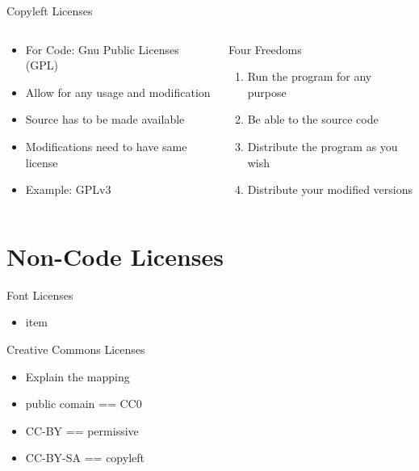 \documentclass[compress,aspectratio=169]{beamer}
\begin{document}
  \begin{frame}{Copyleft Licenses}
    \begin{columns}
      \begin{column}{0.5\textwidth}
        \begin{itemize}
          \item For Code: Gnu Public Licenses (GPL)
          \item Allow for any usage and modification
          \item Source has to be made available
          \item Modifications need to have same license
          \item Example: GPLv3
        \end{itemize}
      \end{column}
      \begin{column}{0.5\textwidth}
        \begin{block}{Four Freedoms \cite{freedoms}}
          \begin{enumerate}
            \item Run the program for any purpose
            \item Be able to the source code
            \item Distribute the program as you wish
            \item Distribute your modified versions
          \end{enumerate}
        \end{block}
      \end{column}
    \end{columns}
  \end{frame}

\section{Non-Code Licenses}

	\begin{frame}{Font Licenses}
		\begin{itemize}
			\item item
		\end{itemize}
	\end{frame}

  \begin{frame}{Creative Commons Licenses}
		\begin{itemize}
			\item Explain the mapping
      \item public comain == CC0
      \item CC-BY == permissive
      \item CC-BY-SA == copyleft
		\end{itemize}
	\end{frame}
\end{document}
